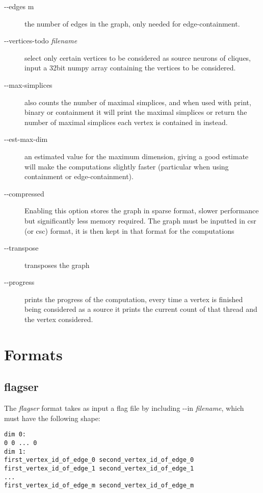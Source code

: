 \documentclass{amsart}
\theoremstyle{definition}
\begin{document}
\begin{description}
  \item [-{}-edges m] the number of edges in the graph, only needed for edge-containment.
  \item [-{}-vertices-todo \textit{filename}] select only certain vertices to be considered as source neurons of cliques, input a 32bit numpy array containing the vertices to be considered.
  \item [-{}-max-simplices] also counts the number of maximal simplices, and when used with print, binary or containment it will print the maximal simplices or return the number of maximal simplices each vertex is contained in instead.
  \item [-{}-est-max-dim] an estimated value for the maximum dimension, giving a good estimate will make the computations slightly faster (particular when using containment or edge-containment).
  \item [-{}-compressed] Enabling this option stores the graph in sparse format, slower performance but significantly less memory required. The graph must be inputted in csr (or csc) format, it is then kept in that format for the computations
  \item [-{}-transpose] transposes the graph
  \item [-{}-progress] prints the progress of the computation, every time a vertex is finished being considered as a source it prints the current count of that thread and the vertex considered.

\end{description}

\vspace{1em}

\section{Formats}
\subsection{flagser}
\noindent
The \textit{flagser} format takes as input a flag file by including -{}-in \textit{filename}, which must have the following shape:

\vspace{.5em}
\begin{verbatim}
dim 0:
0 0 ... 0
dim 1:
first_vertex_id_of_edge_0 second_vertex_id_of_edge_0
first_vertex_id_of_edge_1 second_vertex_id_of_edge_1
...
first_vertex_id_of_edge_m second_vertex_id_of_edge_m
\end{verbatim}
\vspace{.5em}
\end{document}
